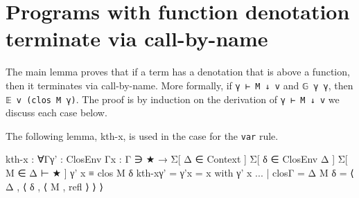 \hypertarget{programs-with-function-denotation-terminate-via-call-by-name}{%
\section{Programs with function denotation terminate via
call-by-name}\label{programs-with-function-denotation-terminate-via-call-by-name}}

The main lemma proves that if a term has a denotation that is above a
function, then it terminates via call-by-name. More formally, if
\texttt{γ\ ⊢\ M\ ↓\ v} and \texttt{𝔾\ γ\ γ\textquotesingle{}}, then
\texttt{𝔼\ v\ (clos\ M\ γ\textquotesingle{})}. The proof is by induction
on the derivation of \texttt{γ\ ⊢\ M\ ↓\ v} we discuss each case below.

The following lemma, kth-x, is used in the case for the \texttt{var}
rule.

\begin{fence}
\begin{code}
kth-x : ∀{Γ}{γ' : ClosEnv Γ}{x : Γ ∋ ★}
     → Σ[ Δ ∈ Context ] Σ[ δ ∈ ClosEnv Δ ] Σ[ M ∈ Δ ⊢ ★ ]
                 γ' x ≡ clos M δ
kth-x{γ' = γ'}{x = x} with γ' x
... | clos{Γ = Δ} M δ = ⟨ Δ , ⟨ δ , ⟨ M , refl ⟩ ⟩ ⟩
\end{code}
\end{fence}

